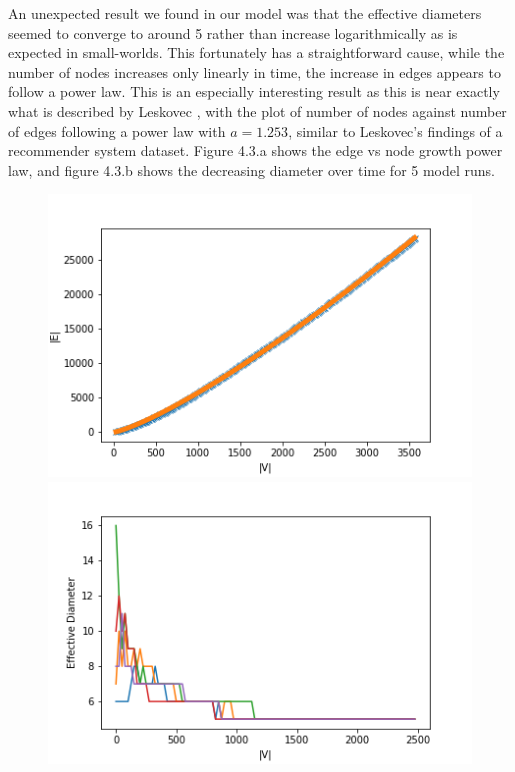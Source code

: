 \documentclass[12pt,twoside]{report}
\begin{document}
An unexpected result we found in our model was that the effective diameters seemed to converge to around 5 rather than increase logarithmically as is expected in small-worlds. This fortunately has a straightforward cause, while the number of nodes increases only linearly in time, the increase in edges appears to follow a power law. This is an especially interesting result as this is near exactly what is described by Leskovec \cite{leskovec2007graph}, with the plot of number of nodes against number of edges following a power law with $a = 1.253$, similar to Leskovec's findings of a recommender system dataset. Figure 4.3.a shows the edge vs node growth power law, and figure 4.3.b shows the decreasing diameter over time for 5 model runs.  \\

\begin{figure}[H]
\begin{center}
\begin{minipage}{0.45\linewidth}
\includegraphics[width=\linewidth]{figures/densification.png}
\end{minipage}%
\hfill
\begin{minipage}{0.45\linewidth}
\includegraphics[width=\linewidth]{figures/diameters.png}
\end{minipage}
\end{center}
\end{figure}
\end{document}
